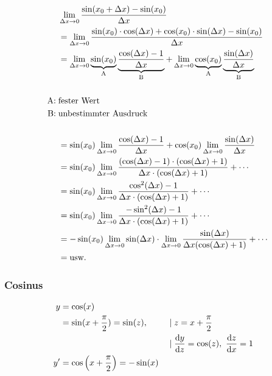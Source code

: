\begin{align*}
	            & \lim_{\Delta x \rightarrow{} 0} \frac{\sin(x_0 + \Delta x) - \sin(x_0)}{\Delta x}                                                                    \\
	            & = \lim_{\Delta x \rightarrow{} 0} \frac{\sin(x_0) \cdot \cos(\Delta x) + \cos(x_0) \cdot \sin(\Delta x) - \sin(x_0)}{\Delta x}                       \\
	            & = \lim_{\Delta x \rightarrow{} 0} \underbrace{\sin(x_0)}_{\text{A}} \underbrace{\frac{\cos(\Delta x) - 1}{\Delta x}}_{\text{B}} +
	\lim_{\Delta x \rightarrow{} 0} \underbrace{\cos(x_0)}_{\text{A}} \underbrace{\frac{\sin(\Delta x)}{\Delta x}}_{\text{B}}                                          \\
	\\
	\text{A:\;} & \text{fester Wert}                                                                                                                        \\
	\text{B:\;} & \text{unbestimmter Ausdruck}                                                                                                              \\
	\\
	            & = \sin(x_0) \lim_{\Delta x \rightarrow{} 0} \frac{\cos(\Delta x) - 1}{\Delta x} + \cos(x_0) \lim_{\Delta x \rightarrow{} 0} \frac{\sin(\Delta x)}{\Delta x}     \\
	            & = \sin(x_0) \lim_{\Delta x \rightarrow{} 0} \frac{(\cos(\Delta x) - 1) \cdot (\cos(\Delta x) + 1)}{\Delta x \cdot (\cos(\Delta x) + 1)} + \cdots     \\
	            & = \sin(x_0) \lim_{\Delta x \rightarrow{} 0} \frac{\cos^2(\Delta x) - 1}{\Delta x \cdot (\cos(\Delta x) + 1)} + \cdots                                \\
	            & = \sin(x_0) \lim_{\Delta x \rightarrow{} 0} \frac{- \sin^2(\Delta x) - 1}{\Delta x \cdot (\cos(\Delta x) + 1)} + \cdots                              \\
	            & = -\sin(x_0) \lim_{\Delta x \rightarrow{} 0} \sin(\Delta x) \cdot \lim_{\Delta x \rightarrow{} 0} \frac{\sin(\Delta x)}{\Delta x (\cos(\Delta x) + 1)} + \cdots \\
	            & = \text{usw.}
\end{align*}

\subsubsection{Cosinus}

\begin{align*}
	y  & = \cos(x)                                                                                                                 \\
	   & = \sin(x + \frac{\pi}{2}) = \sin(z),            &  & \mid z = x + \frac{\pi}{2}                                           \\
	   &                                                 &  & \mid \frac{\mathop{}\!\mathrm{d} y}{\mathop{}\!\mathrm{d} z} = \cos(z),\ \frac{\mathop{}\!\mathrm{d} z}{\mathop{}\!\mathrm{d} x} = 1 \\
	y' & = \cos\left(x + \frac{\pi}{2}\right) = -\sin(x)
\end{align*}


